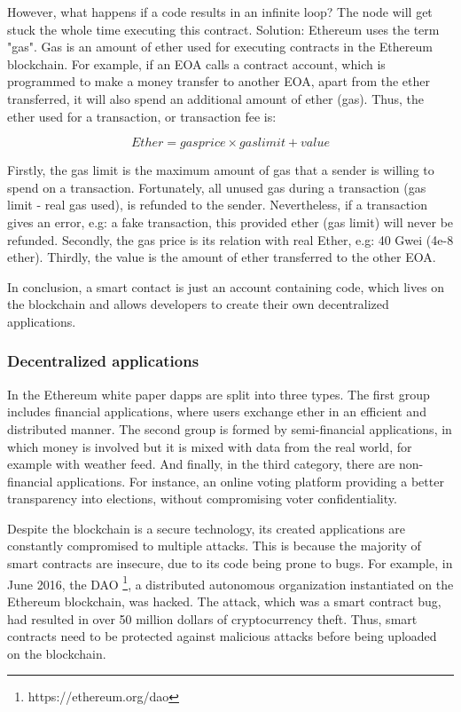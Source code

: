 However, what happens if a code results in an infinite loop? The node will get stuck the whole time executing this contract. Solution: Ethereum uses the term "gas". Gas is an amount of ether used for executing contracts in the Ethereum blockchain. For example, if an EOA calls a contract account, which is programmed to make a money transfer to another EOA, apart from the ether transferred, it will also spend an additional amount of ether (gas). Thus, the ether used for a transaction, or transaction fee is:

$$Ether = gas price \times gas limit + value$$

Firstly, the gas limit is the maximum amount of gas that a sender is willing to spend on a transaction. Fortunately, all unused gas during a transaction (gas limit - real gas used), is refunded to the sender. Nevertheless, if a transaction gives an error, e.g: a fake transaction, this provided ether (gas limit) will never be refunded. Secondly, the gas price is its relation with real Ether, e.g: 40 Gwei (4e-8 ether). Thirdly, the value is the amount of ether transferred to the other EOA.

In conclusion, a smart contact is just an account containing code, which lives on the blockchain and allows developers to create their own decentralized applications. 

\subsubsection{Decentralized applications}

In the Ethereum white paper \cite{buterin2014next} dapps are split into three types. The first group includes financial applications, where users exchange ether in an efficient and distributed manner. The second group is formed by semi-financial applications, in which money is involved but it is mixed with data from the real world, for example with weather feed. And finally, in the third category, there are non-financial applications. For instance, an online voting platform providing a better transparency into elections, without compromising voter confidentiality.

Despite the blockchain is a secure technology, its created applications are constantly compromised to multiple attacks. This is because the majority of smart contracts are insecure, due to its code being prone to bugs.
For example, in June 2016, the DAO \footnote{https://ethereum.org/dao}, a distributed autonomous organization instantiated on the Ethereum blockchain, was hacked. The attack, which was a smart contract bug, had resulted in over 50 million dollars of cryptocurrency theft. Thus, smart contracts need to be protected against malicious attacks before being uploaded on the blockchain.

